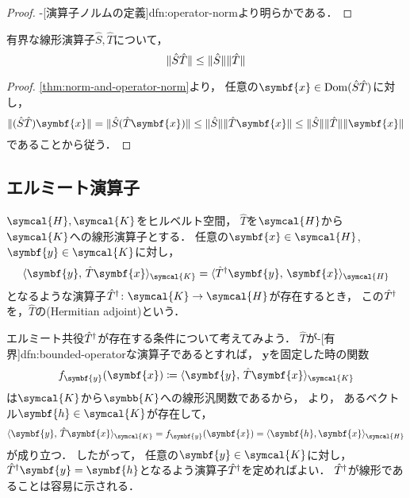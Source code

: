 \documentclass[../sotsu.tex]{subfiles}
\begin{document}
\begin{proof}
    -[演算子ノルムの定義]{dfn:operator-norm}より明らかである．
\end{proof}



\begin{proposition}
    有界な線形演算子$\hat{S}, \hat{T}$について，
    \begin{equation*}
        \lVert\hat{S} \hat{T}\rVert \leq \lVert\hat{S}\rVert \lVert\hat{T}\rVert
    \end{equation*}
\end{proposition}

\begin{proof}
    \cref{thm:norm-and-operator-norm}より，
    任意の$\symbf{x} \in \domain(\hat{S} \hat{T})$に対し，
    \begin{equation*}
        \norm{(\hat{S} \hat{T}) \symbf{x}}
        = \norm{\hat{S} (\hat{T} \symbf{x})}
        \leq \opnorm{\hat{S}} \norm{\hat{T} \symbf{x}}
        \leq \opnorm{\hat{S}} \opnorm{\hat{T}} \norm{\symbf{x}}
    \end{equation*}
    であることから従う．
\end{proof}



\subsection{エルミート演算子}
\label{sec:Hermitian-operator}

\begin{definition}[エルミート共役]
    $\symcal{H}, \symcal{K}$をヒルベルト空間，
    $\hat{T}$を$\symcal{H}$から$\symcal{K}$への線形演算子とする．
    任意の$\symbf{x} \in \symcal{H}$, 
    $\symbf{y} \in \symcal{K}$に対し，
    \begin{equation}
        \iparen{ \symbf{y}, \, \hat{T} \symbf{x} }_{\symcal{K}}
            = \iparen{ \adjoint{\hat{T}} \symbf{y}, \, \symbf{x} }_{\symcal{H}}
    \end{equation}
    となるような演算子$\adjoint{\hat{T}} \colon \symcal{K} \to \symcal{H}$が存在するとき，
    この${\hat{T}}^\dagger$を，$\hat{T}$の(Hermitian adjoint)という．
\end{definition}

エルミート共役${\hat{T}}^\dagger$が存在する条件について考えてみよう．
$\hat{T}$が-[有界]{dfn:bounded-operator}な演算子であるとすれば，
$\symbf{y}$を固定した時の関数
\[  
    f_{\symbf{y}} (\symbf{x}) \coloneq \iparen{ \symbf{y}, \, \hat{T} \symbf{x} }_{\symcal{K}} 
\]
は$\symcal{K}$から$\symbb{K}$への線形汎関数であるから，
より，
あるベクトル$\symbf{h} \in \symcal{K}$が存在して，
\[
    \iparen{\symbf{y}, \, \hat{T} \symbf{x}}_{\symcal{K}}
    = f_{\symbf{y}} (\symbf{x})
    = \iparen{\symbf{h}, \symbf{x}}_{\symcal{H}}
\]
が成り立つ．
したがって，
任意の$\symbf{y} \in \symcal{K}$に対し，
$\adjoint{\hat{T}} \symbf{y} = \symbf{h}$となるよう演算子${\hat{T}}^\dagger$を定めればよい．
${\hat{T}}^\dagger$が線形であることは容易に示される．
\end{document}
